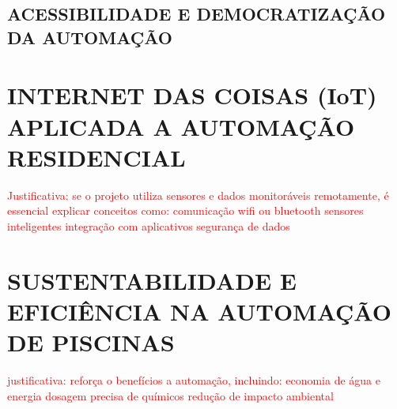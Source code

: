     \subsection{ACESSIBILIDADE E DEMOCRATIZAÇÃO DA AUTOMAÇÃO}


\section{INTERNET DAS COISAS (IoT) APLICADA A AUTOMAÇÃO RESIDENCIAL}
    \textcolor{red}{Justificativa: se o projeto utiliza sensores e dados monitoráveis remotamente, é essencial explicar conceitos como:
        comunicação wifi ou bluetooth
        sensores inteligentes
        integração com aplicativos
        segurança de dados}

\section{SUSTENTABILIDADE E EFICIÊNCIA NA AUTOMAÇÃO DE PISCINAS}
    \textcolor{red}{justificativa: reforça o benefícios a automação, incluindo:
        economia de água e energia
        dosagem precisa de químicos
        redução de impacto ambiental}

